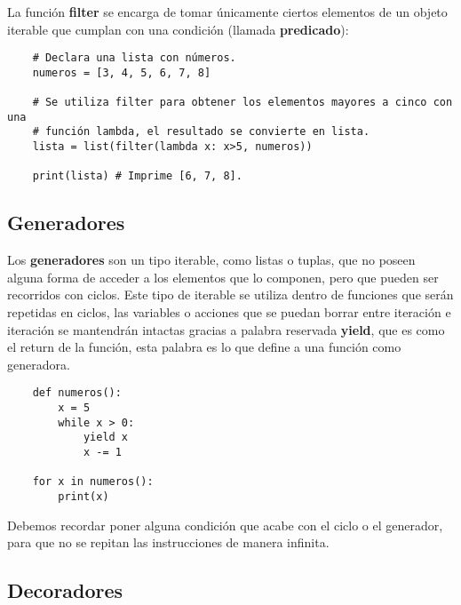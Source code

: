 La función \textbf{filter} se encarga de tomar únicamente ciertos elementos de un objeto iterable que cumplan con una condición (llamada \textbf{predicado}):
\begin{lstlisting}
    # Declara una lista con números.
    numeros = [3, 4, 5, 6, 7, 8]
    
    # Se utiliza filter para obtener los elementos mayores a cinco con una
    # función lambda, el resultado se convierte en lista.
    lista = list(filter(lambda x: x>5, numeros))

    print(lista) # Imprime [6, 7, 8].
\end{lstlisting}


\subsection{Generadores}

Los \textbf{generadores} son un tipo iterable, como listas o tuplas, que no poseen alguna forma de acceder a los elementos que lo componen, pero que pueden ser recorridos con ciclos. Este tipo de iterable se utiliza dentro de funciones que serán repetidas en ciclos, las variables o acciones que se puedan borrar entre iteración e iteración se mantendrán intactas gracias a palabra reservada \textbf{yield}, que es como el return de la función, esta palabra es lo que define a una función como generadora.
\begin{lstlisting}
    def numeros():
        x = 5
        while x > 0:
            yield x
            x -= 1

    for x in numeros():
        print(x)
\end{lstlisting}

Debemos recordar poner alguna condición que acabe con el ciclo o el generador, para que no se repitan las instrucciones de manera infinita.


\subsection{Decoradores}

